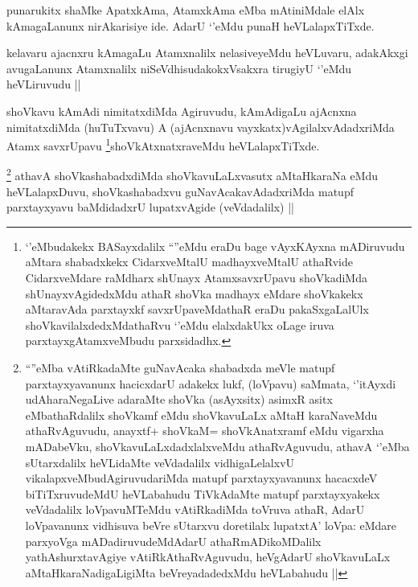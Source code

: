 \begin{artha}
punarukitx shaMke ApatxkAma, AtamxkAma eMba mAtiniMdale elAlx kAmagaLanunx nirAkarisiye ide. AdarU `\stext'eMdu punaH heVLalapxTiTxde.
\end{artha}


\begin{artha}
kelavaru ajacnxru kAmagaLu Atamxnalilx nelasiveyeMdu heVLuvaru, adakAkxgi avugaLanunx Atamxnalilx niSeVdhisudakokxVsakxra tirugiyU `\stext'eMdu heVLiruvudu ||
\end{artha}


\begin{artha}
shoVkavu kAmAdi nimitatxdiMda Agiruvudu, kAmAdigaLu ajAcnxna nimitatxdiMda (huTuTxvavu) A (ajAcnxnavu vayxkatx)vAgilalxvAdadxriMda Atamx savxrUpavu \footnote{`\stext'eMbudakekx BASayxdalilx ``\stext''eMdu eraDu bage vAyxKAyxna mADiruvudu aMtara shabadxkekx CidarxveMtalU madhayxveMtalU athaRvide CidarxveMdare raMdharx shUnayx AtamxsavxrUpavu shoVkadiMda shUnayxvAgidedxMdu athaR shoVka madhayx eMdare shoVkakekx aMtaravAda parxtayxkf savxrUpaveMdathaR eraDu pakaSxgaLalUlx shoVkavilalxdedxMdathaRvu `\stext'eMdu elalxdakUkx oLage iruva parxtayxgAtamxveMbudu parxsidadhx.}shoVkAtxnatxraveMdu heVLalapxTiTxde.
\end{artha}


\begin{artha}
\footnote{``\stext''eMba vAtiRkadaMte guNavAcaka shabadxda meVle matupf parxtayxyavanunx hacicxdarU adakekx lukf, (loVpavu) saMmata, `\stext'itAyxdi udAharaNegaLive adaraMte shoVka (asAyxsitx) asimxR asitx eMbathaRdalilx shoVkamf eMdu shoVkavuLaLx aMtaH karaNaveMdu athaRvAguvudu, anayxtf+ shoVkaM= shoVkAnatxramf eMdu vigarxha mADabeVku, shoVkavuLaLxdadxlalxveMdu athaRvAguvudu, athavA `\stext'eMba sUtarxdalilx heVLidaMte veVdadalilx vidhigaLelalxvU vikalapxveMbudAgiruvudariMda matupf parxtayxyavanunx hacacxdeV biTiTxruvudeMdU heVLabahudu TiVkAdaMte matupf parxtayxyakekx veVdadalilx loVpavuMTeMdu vAtiRkadiMda toVruva athaR, AdarU loVpavanunx vidhisuva beVre sUtarxvu doretilalx lupatxtA' loVpa: eMdare parxyoVga mADadiruvudeMdAdarU athaRmADikoMDalilx yathAshurxtavAgiye vAtiRkAthaRvAguvudu, heVgAdarU shoVkavuLaLx aMtaHkaraNadigaLigiMta beVreyadadedxMdu heVLabahudu ||}
athavA shoVkashabadxdiMda shoVkavuLaLxvasutx aMtaHkaraNa eMdu heVLalapxDuvu, shoVkashabadxvu guNavAcakavAdadxriMda matupf parxtayxyavu baMdidadxrU lupatxvAgide (veVdadalilx) ||  
\end{artha}


